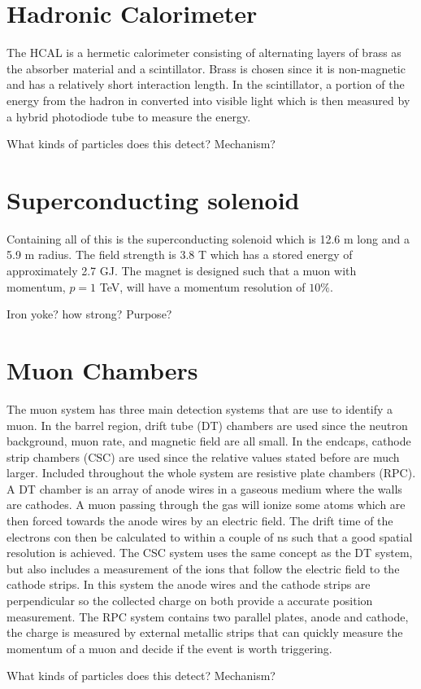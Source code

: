 \section{Hadronic Calorimeter}
\label{sec:HCAL}

The HCAL is a hermetic calorimeter consisting of alternating layers of brass as the absorber material and a scintillator. Brass is chosen since it is non-magnetic and has a relatively short interaction length. In the scintillator, a portion of the energy from the hadron in converted into visible light which is then measured by a hybrid photodiode tube to measure the energy. 

What kinds of particles does this detect? Mechanism?

\section{Superconducting solenoid}
\label{sec:Solenoid}

Containing all of this is the superconducting solenoid which is 12.6 m long and a 5.9 m radius. The field strength is 3.8 T which has a stored energy of approximately 2.7 GJ. The magnet is designed such that a muon with momentum, $p=1$ TeV, will have a momentum resolution of $10\%$.

Iron yoke? how strong? Purpose?

\section{Muon Chambers}
\label{sec:muCham}

The muon system has three main detection systems that are use to identify a muon. In the barrel region, drift tube (DT) chambers are used since the neutron background, muon rate, and magnetic field are all small. In the endcaps, cathode strip chambers (CSC) are used since the relative values stated before are much larger. Included throughout the whole system are resistive plate chambers (RPC). A DT chamber is an array of anode wires in a gaseous medium where the walls are cathodes. A muon passing through the gas will ionize some atoms which are then forced towards the anode wires by an electric field. The drift time of the electrons con then be calculated to within a couple of ns such that a good spatial resolution is achieved. The CSC system uses the same concept as the DT system, but also includes a measurement of the ions that follow the electric field to the cathode strips. In this system the anode wires and the cathode strips are perpendicular so the collected charge on both provide a accurate position measurement. The RPC system contains two parallel plates, anode and cathode, the charge is measured by external metallic strips that can quickly measure the momentum of a muon and decide if the event is worth triggering.

What kinds of particles does this detect? Mechanism?